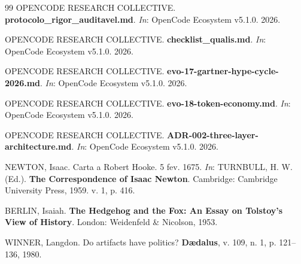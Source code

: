 \begin{thebibliography}{99}
OPENCODE RESEARCH COLLECTIVE. \textbf{protocolo\_rigor\_auditavel.md}. \textit{In}: OpenCode Ecosystem v5.1.0. 2026.

OPENCODE RESEARCH COLLECTIVE. \textbf{checklist\_qualis.md}. \textit{In}: OpenCode Ecosystem v5.1.0. 2026.

OPENCODE RESEARCH COLLECTIVE. \textbf{evo-17-gartner-hype-cycle-2026.md}. \textit{In}: OpenCode Ecosystem v5.1.0. 2026.

OPENCODE RESEARCH COLLECTIVE. \textbf{evo-18-token-economy.md}. \textit{In}: OpenCode Ecosystem v5.1.0. 2026.

OPENCODE RESEARCH COLLECTIVE. \textbf{ADR-002-three-layer-architecture.md}. \textit{In}: OpenCode Ecosystem v5.1.0. 2026.

NEWTON, Isaac. Carta a Robert Hooke. 5 fev. 1675. \textit{In}: TURNBULL, H. W. (Ed.). \textbf{The Correspondence of Isaac Newton}. Cambridge: Cambridge University Press, 1959. v. 1, p. 416.

BERLIN, Isaiah. \textbf{The Hedgehog and the Fox: An Essay on Tolstoy's View of History}. London: Weidenfeld \& Nicolson, 1953.

WINNER, Langdon. Do artifacts have politics? \textbf{Dædalus}, v. 109, n. 1, p. 121--136, 1980.

\end{thebibliography}
